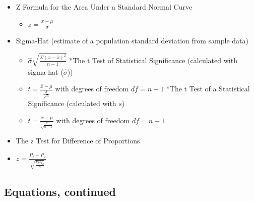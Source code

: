 \documentclass[]{article}
\begin{document}
\begin{itemize}
\itemsep1pt\parskip0pt
\item
  Z Formula for the Area Under a Standard Normal Curve

  \begin{itemize}
  \itemsep1pt\parskip0pt
  \item
    $z = \frac{x - \mu}{\sigma}$
  \end{itemize}
\item
  Sigma-Hat (estimate of a population standard deviation from sample
  data)

  \begin{itemize}
  \itemsep1pt\parskip0pt
  \item
    $\hat{\sigma} \sqrt{\frac{\Sigma(x - \bar{x})^2}{n-1}}$ *The t Test
    of Statistical Significance (calculated with sigma-hat
    ($\hat{\sigma}$))
  \item
    $t = \frac{\bar{x}-\mu}{\frac{\hat{\sigma}}{\sqrt{n}}}$ with degrees
    of freedom $df = n-1$ *The t Test of a Statistical Significance
    (calculated with $s$)
  \item
    $t = \frac{\bar{x}-\mu}{\frac{s}{\sqrt{n -1}}}$ with degrees of
    freedom $df = n-1$
  \end{itemize}
\item
  The z Test for Difference of Proportions
\item
  $z = \frac{P_s - P_p}{\sqrt{\frac{P_PQ_p}{n}}}$
\end{itemize}

\subsection{Equations, continued}\label{equations-continued}
\end{document}
